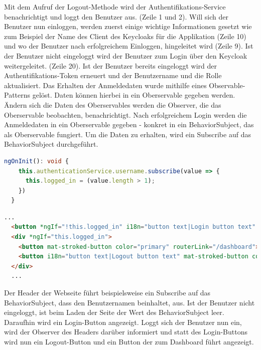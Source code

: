 Mit dem Aufruf der Logout-Methode wird der Authentifikations-Service benachrichtigt und loggt den Benutzer aus. (Zeile 1 und 2).
Will sich der Benutzer nun einloggen, werden zuerst einige wichtige Informationen gesetzt wie zum Beispiel der Name des Client des Keycloaks 
für die Applikation (Zeile 10) und wo der Benutzer nach erfolgreichem Einloggen, hingeleitet wird (Zeile 9). Ist der 
Benutzer nicht eingeloggt wird der Benutzer zum Login über den Keycloak weitergeleitet. (Zeile 20). 
Ist der Benutzer bereits eingeloggt wird der Authentifikations-Token erneuert und der Benutzername und die Rolle aktualisiert.
\newline
\newline
Das Erhalten der Anmeldedaten wurde mithilfe eines Observable-Patterns gelöst. Daten können hierbei in ein Oberservable gegeben werden.
Ändern sich die Daten des Oberservables werden die Observer, die das Oberservable beobachten, benachrichtigt.
\newline
\newline
Nach erfolgreichem Login werden die Anmeldedaten in ein Oberservable gegeben - konkret in ein BehaviorSubject, das als Oberservable 
fungiert. Um die Daten zu erhalten, wird ein Subscribe auf das BehaviorSubject durchgeführt.
\newline
\newline
\begin{lstlisting}[language=TypeScript, caption=Verwendung der geschickten Daten TypeScript, label=lst:Verwendung der Anmeldedaten TypeScript]
  ngOnInit(): void {
    this.authenticationService.username.subscribe(value => {
      this.logged_in = (value.length > 1);
    })
  }
\end{lstlisting}
\begin{lstlisting}[language=html, caption=Verwendung der geschickten Daten HTML, label=Verwendung der Anmeldedaten HTML]
  ...
  <button *ngIf="!this.logged_in" i18n="button text|Login button text" mat-stroked-button color="primary" (click)="openLogin()">Einloggen</button>
  <div *ngIf="this.logged_in">
    <button mat-stroked-button color="primary" routerLink="/dashboard">Dashboard</button>
    <button i18n="button text|Logout button text" mat-stroked-button color="primary" (click)="loggoutUser()">Ausloggen</button>
  </div>
  ...
\end{lstlisting}
Der Header der Webseite führt beispielsweise ein Subscribe auf das BehaviorSubject, dass den Benutzernamen beinhaltet, aus. Ist der 
Benutzer nicht eingeloggt, ist beim Laden der Seite der Wert des BehaviorSubject leer. Daraufhin wird ein Login-Button angezeigt.
Loggt sich der Benutzer nun ein, wird der Observer des Headers darüber informiert und statt des Login-Buttons wird nun ein 
Logout-Button und ein Button der zum Dashboard führt angezeigt.

